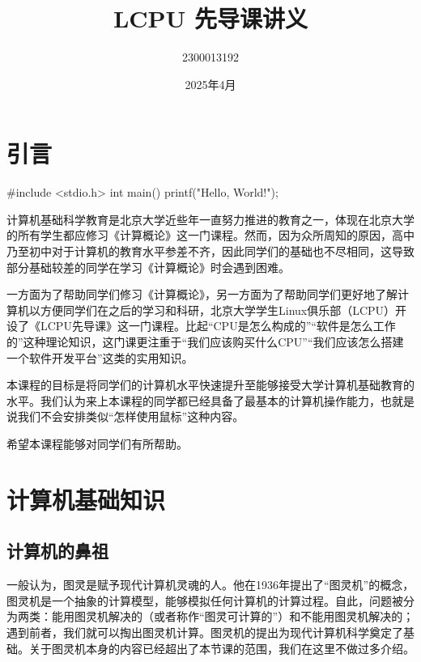 \documentclass[12pt]{report}
\title{LCPU 先导课讲义}
\author{2300013192}
\date{2025年4月}
\begin{document}
\maketitle
\tableofcontents

\setcounter{chapter}{-1}

\chapter{引言} %

\begin{codebox}[title=你好，计算机！]
    #include <stdio.h>
    int main() {
        printf("Hello, World!\n");
    }
\end{codebox}

计算机基础科学教育是北京大学近些年一直努力推进的教育之一，体现在北京大学的所有学生都应修习《计算概论》这一门课程。然而，因为众所周知的原因，高中乃至初中对于计算机的教育水平参差不齐，因此同学们的基础也不尽相同，这导致部分基础较差的同学在学习《计算概论》时会遇到困难。

一方面为了帮助同学们修习《计算概论》，另一方面为了帮助同学们更好地了解计算机以方便同学们在之后的学习和科研，北京大学学生Linux俱乐部（LCPU）开设了《LCPU先导课》这一门课程。比起“CPU是怎么构成的”“软件是怎么工作的”这种理论知识，这门课更注重于“我们应该购买什么CPU”“我们应该怎么搭建一个软件开发平台”这类的实用知识。

本课程的目标是将同学们的计算机水平快速提升至能够接受大学计算机基础教育的水平。我们认为来上本课程的同学都已经具备了最基本的计算机操作能力，也就是说我们不会安排类似“怎样使用鼠标”这种内容。

希望本课程能够对同学们有所帮助。

\chapter{计算机基础知识} %

\section{计算机的鼻祖}

一般认为，图灵是赋予现代计算机灵魂的人。他在1936年提出了“图灵机”的概念，图灵机是一个抽象的计算模型，能够模拟任何计算机的计算过程。自此，问题被分为两类：能用图灵机解决的（或者称作“图灵可计算的”）和不能用图灵机解决的；遇到前者，我们就可以掏出图灵机计算。图灵机的提出为现代计算机科学奠定了基础。关于图灵机本身的内容已经超出了本节课的范围，我们在这里不做过多介绍。
\end{document}
